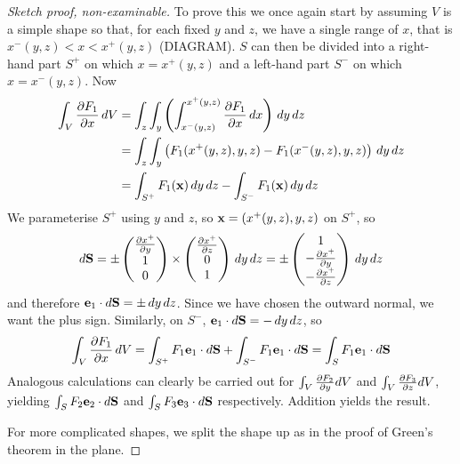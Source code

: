 \documentclass{../template/note}
\begin{document}
    \begin{proof}[Sketch proof, non-examinable]
        To prove this we once again start by assuming \(V\) is a simple shape so that, for each fixed \(y\) and \(z\), we have a single range of \(x\), that is \(x^-(y, z) < x < x^+(y, z)\) (DIAGRAM). \(S\) can then be divided into a right-hand part \(S^+\) on which \(x = x^+(y, z)\) and a left-hand part \(S^-\) on which \(x = x^-(y, z)\). Now
        \begin{align*}
            \int_V \pd{F_1} x \D V &= \int_z \int_y \left(\int_{x^-(y, z)}^{x^+(y, z)} \pd{F_1} x \D x\right) \D y \D z \\
            &= \int_z \int_y \left(F_1(x^+(y, z), y, z) - F_1(x^-(y, z), y, z)\right) \D y \D z \\
            &= \int_{S^+} F_1(\V x) \D y \D z - \int_{S^-} F_1(\V x) \D y \D z
        \end{align*}
        We parameterise \(S^+\) using \(y\) and \(z\), so \(\V x = (x^+(y, z), y, z)\) on \(S^+\), so
        \begin{align*}
            d\V S = \pm \begin{pmatrix}
             \pd{x^+}{y} \\
             1 \\
             0 \\
            \end{pmatrix} \times \begin{pmatrix}
             \pd{x^+}{z} \\
             0 \\
             1 \\
            \end{pmatrix} \D y \D z = \pm \begin{pmatrix}
             1 \\
             -\pd{x^+}y \\
             -\pd{x^+}z \\
            \end{pmatrix} \D y \D z
        \end{align*}
        and therefore \(\V e_1 \cdot d \V S = \pm \D y \D z\). Since we have chosen the outward normal, we want the plus sign. Similarly, on \(S^-\), \(\V e_1 \cdot d \V S = -\D y \D z\), so
        \begin{align*}
            \int_V \pd{F_1} x \D V = \int_{S^+} F_1 \V e_1 \cdot d\V S + \int_{S^-} F_1 \V e_1 \cdot d\V S = \int_S F_1 \V e_1 \cdot d\V S
        \end{align*}
        Analogous calculations can clearly be carried out for \(\int_V \pd{F_2} y dV\) and \(\int_V \pd{F_3} z dV\), yielding \(\int_S F_2 \V e_2 \cdot d \V S\) and \(\int_S F_3 \V e_3 \cdot d \V S\) respectively. Addition yields the result.

        For more complicated shapes, we split the shape up as in the proof of Green's theorem in the plane.    
    \end{proof}
    
\end{document}
